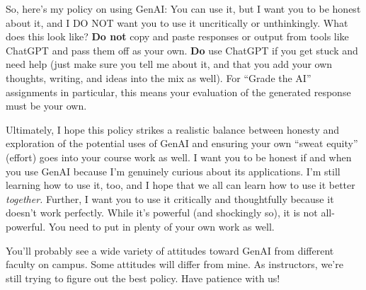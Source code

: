\documentclass[11pt,]{article}
\begin{document}
So, here's my policy on using GenAI: You can use it, but I want you to
be honest about it, and I DO NOT want you to use it uncritically or
unthinkingly. What does this look like? \textbf{Do not} copy and paste
responses or output from tools like ChatGPT and pass them off as your
own. \textbf{Do} use ChatGPT if you get stuck and need help (just make
sure you tell me about it, and that you add your own thoughts, writing,
and ideas into the mix as well). For ``Grade the AI'' assignments in
particular, this means your evaluation of the generated response must be
your own.

Ultimately, I hope this policy strikes a realistic balance between
honesty and exploration of the potential uses of GenAI and ensuring your
own ``sweat equity'' (effort) goes into your course work as well. I want
you to be honest if and when you use GenAI because I'm genuinely curious
about its applications. I'm still learning how to use it, too, and I
hope that we all can learn how to use it better \emph{together.}
Further, I want you to use it critically and thoughtfully because it
doesn't work perfectly. While it's powerful (and shockingly so), it is
not all-powerful. You need to put in plenty of your own work as well.

You'll probably see a wide variety of attitudes toward GenAI from
different faculty on campus. Some attitudes will differ from mine. As
instructors, we're still trying to figure out the best policy. Have
patience with us!
\end{document}
